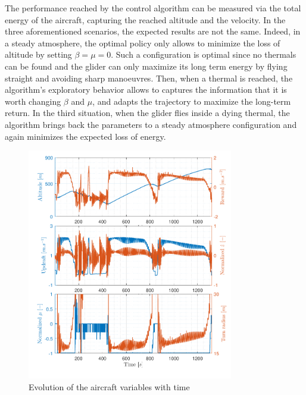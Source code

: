 \documentclass[a4paper, 10pt, conference]{ieeeconf}
\begin{document}
The performance reached by the control algorithm can be measured via the total energy of the aircraft, capturing the reached altitude and the velocity. In the three aforementioned scenarios, the expected results are not the same. Indeed, in a steady atmosphere, the optimal policy only allows to minimize the loss of altitude by setting $\beta = \mu = 0$. Such a configuration is optimal since no thermals can be found and the glider can only maximize its long term energy by flying straight and avoiding sharp manoeuvres. Then, when a thermal is reached, the algorithm's exploratory behavior allows to captures the information that it is worth changing $\beta$ and $\mu$, and adapts the trajectory to maximize the long-term return. In the third situation, when the glider flies inside a dying thermal, the algorithm brings back the parameters to a steady atmosphere configuration and again minimizes the expected loss of energy.


\begin{figure}
\begin{center}
 \includegraphics[width=9cm]{img/traj_var.pdf}
\end{center}
\caption{Evolution of the aircraft variables with time}
\label{fig:traj_rho}
\end{figure}
\end{document}
